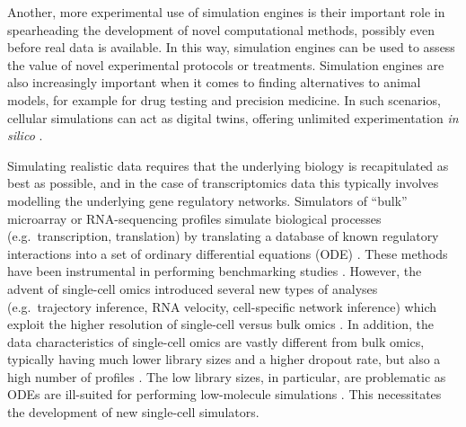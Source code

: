 \documentclass[10pt, a4paper]{article}
\begin{document}
Another, more experimental use of simulation engines is their important
role in spearheading the development of novel computational methods,
possibly even before real data is available. In this way, simulation
engines can be used to assess the value of novel experimental protocols
or treatments. Simulation engines are also increasingly important when
it comes to finding alternatives to animal models, for example for drug
testing and precision medicine. In such scenarios, cellular simulations
can act as digital twins, offering unlimited experimentation \emph{in
silico} \cite{bjornsson_digitaltwinspersonalize_2019}.

Simulating realistic data requires that the underlying biology is
recapitulated as best as possible, and in the case of transcriptomics
data this typically involves modelling the underlying gene regulatory
networks. Simulators of ``bulk'' microarray or RNA-sequencing profiles
simulate biological processes (e.g.~transcription, translation) by
translating a database of known regulatory interactions into a set of
ordinary differential equations (ODE)
\cite{roy_systemgeneratingtranscription_2008,hache_gengesystematicgeneration_2009,schaffter_genenetweaversilicobenchmark_2011,vandenbulcke_syntrengeneratorsynthetic_2006}.
These methods have been instrumental in performing benchmarking studies
\cite{prill_rigorousassessmentsystems_2010,marbach_revealingstrengthsweaknesses_2010,marbach_wisdomcrowdsrobust_2012}.
However, the advent of single-cell omics introduced several new types of
analyses (e.g.~trajectory inference, RNA velocity, cell-specific network
inference) which exploit the higher resolution of single-cell versus
bulk omics \cite{luecken_currentbestpractices_2019}. In addition,
the data characteristics of single-cell omics are vastly different from
bulk omics, typically having much lower library sizes and a higher
dropout rate, but also a high number of profiles
\cite{vallejos_normalizingsinglecellrna_2017}. The low library
sizes, in particular, are problematic as ODEs are ill-suited for
performing low-molecule simulations
\cite{gillespie_exactstochasticsimulation_1977}. This necessitates
the development of new single-cell simulators.
\end{document}
